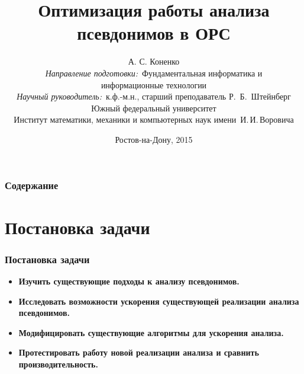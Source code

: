 \documentclass[utf8,russian]{beamer}
\title{\small{Оптимизация работы анализа псевдонимов в ОРС}}
\author{\small{%
А. С. Коненко\\%
\emph{Направление подготовки:}~Фундаментальная информатика и \\информационные технологии\\%
\emph{Научный руководитель:}~к.ф.-м.н., старший преподаватель Р.~Б.~Штейнберг}\\%
\vspace{15pt}%
    Южный федеральный университет\\
    Институт математики, механики и компьютерных наук
    имени~И.\,И.\,Воровича%
}
\date{\small{Ростов-на-Дону, 2015}}
\begin{document}
\begin{frame}
\titlepage %
\end{frame}

\begin{frame}
\frametitle{Содержание} %
\tableofcontents %
\end{frame}


\section{Постановка задачи}

\begin{frame}
\frametitle{Постановка задачи}
\begin{itemize}
  \item \textbf{Изучить существующие подходы к анализу псевдонимов.}
  \item \textbf{Исследовать возможности ускорения существующей реализации анализа псевдонимов.}  %
  \item \textbf{Модифицировать существующие алгоритмы для ускорения анализа.} 
  \item \textbf{Протестировать работу новой реализации анализа и сравнить производительность.} 
\end{itemize}
\end{frame}

\end{document}

